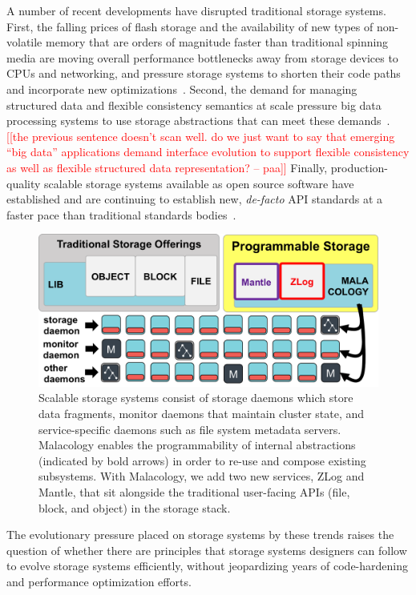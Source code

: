 \documentclass[preprint]{sigplanconf-eurosys}
\newcommand{\paa}[1]{{\textcolor{red}{[[#1 -- paa]]}}}
\begin{document}
A number of recent developments have disrupted traditional storage systems.
First, the falling prices of flash storage and the availability of new types of
non-volatile memory that are orders of magnitude faster than traditional
spinning media are moving overall performance bottlenecks away from storage
devices to CPUs and networking, and pressure storage systems to shorten their
code paths and incorporate new
optimizations~\cite{gray_tape_2007,gray_flash_2008}. 
Second, the demand for
managing structured data and flexible consistency semantics at scale pressure
big data processing systems to use storage abstractions that can meet these
demands~\cite{apache_contributors_parquet_2014}. 
\paa{the previous sentence doesn't scan well. do we just want to say that 
emerging ``big data'' applications demand interface evolution to support flexible
consistency as well as flexible structured data representation?}
Finally, production-quality
scalable storage systems available as open source software have established and
are continuing to establish new, \emph{de-facto} API standards at a faster pace
than traditional standards
bodies~\cite{snia_implementing_2014,linux_foundation_kinetic_2015}.

\begin{figure}[tb]
\centering
\includegraphics{figures/overview.png}
\caption{Scalable storage systems consist of storage daemons which store data
fragments, monitor daemons that maintain cluster state, and service-specific
daemons such as file system metadata servers. Malacology enables the
programmability of internal abstractions (indicated by bold arrows) in order to
re-use and compose existing subsystems.  With Malacology, we add two new
services, ZLog and Mantle, that sit alongside the traditional user-facing APIs
(file, block, and object) in the storage stack.  \label{fig:overview}}
\end{figure}

The evolutionary pressure placed on storage systems by these trends raises the
question of whether
there are principles that storage systems designers can follow
to evolve storage systems efficiently, without jeopardizing years of
code-hardening and performance optimization efforts.
\end{document}
